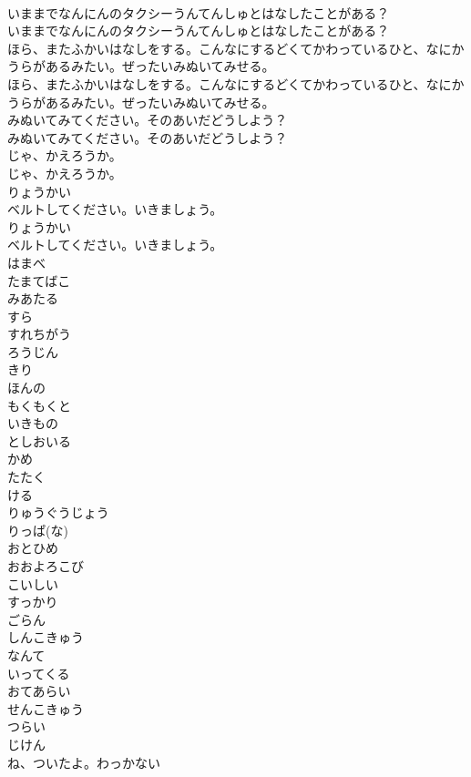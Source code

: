 \documentclass[8pt]{extreport}
\begin{document}
\begin{CJK}{UTF8}{min}
\\	いままでなんにんのタクシーうんてんしゅとはなしたことがある？
\\	いままでなんにんのタクシーうんてんしゅとはなしたことがある？
\\	ほら、またふかいはなしをする。こんなにするどくてかわっているひと、なにかうらがあるみたい。ぜったいみぬいてみせる。
\\	ほら、またふかいはなしをする。こんなにするどくてかわっているひと、なにかうらがあるみたい。ぜったいみぬいてみせる。
\\	みぬいてみてください。そのあいだどうしよう？
\\	みぬいてみてください。そのあいだどうしよう？
\\	じゃ、かえろうか。
\\	じゃ、かえろうか。
\\	りょうかい
\\	ベルトしてください。いきましょう。
\\	りょうかい
\\	ベルトしてください。いきましょう。
\\	はまべ
\\	たまてばこ
\\	みあたる
\\	すら
\\	すれちがう
\\	ろうじん
\\	きり
\\	ほんの
\\	もくもくと
\\	いきもの
\\	としおいる
\\	かめ
\\	たたく
\\	ける
\\	りゅうぐうじょう
\\	りっぱ(な)
\\	おとひめ
\\	おおよろこび
\\	こいしい
\\	すっかり
\\	ごらん
\\	しんこきゅう
\\	なんて
\\	いってくる
\\	おてあらい
\\	せんこきゅう
\\	つらい
\\	じけん
\\	ね、ついたよ。わっかない

\end{CJK}
\end{document}
